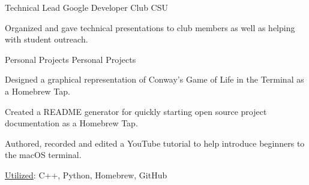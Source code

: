 

\begin{cventries}


    \cventry
    {Technical Lead} %
    {Google Developer Club } %
    {CSU} %
    {} %
    {
      \begin{cvitems} %
        \item {Organized and gave technical presentations to club members as well as helping with student outreach.}
      \end{cvitems}
    }


  \cventry
    {Personal Projects} %
    {Personal Projects} %
    {} %
    {} %
    {
      \begin{cvitems} %
        \item {Designed a graphical representation of Conway's Game of Life in the Terminal as a Homebrew Tap.}
        \item {Created a README generator for quickly starting open source project documentation as a Homebrew Tap.}
        \item {Authored, recorded and edited a YouTube tutorial to help introduce beginners to the macOS terminal.}
        \item {\underline{Utilized}: C++, Python, Homebrew, GitHub}
      \end{cvitems}
    }




\end{cventries}
